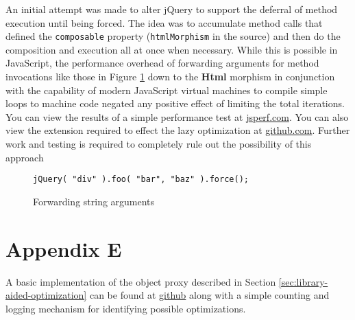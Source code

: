 \documentclass[preprint]{sigplanconf}
\begin{document}
An initial attempt was made to alter jQuery to support the deferral of method execution until being forced. The idea was to accumulate method calls that defined the \verb|composable| property (\verb|htmlMorphism| in the source) and then do the composition and execution all at once when necessary. While this is possible in JavaScript, the performance overhead of forwarding arguments for method invocations like those in Figure \ref{fig:args-juggle} down to the \textbf{Html} morphism in conjunction with the capability of modern JavaScript virtual machines to compile simple loops to machine code negated any positive effect of limiting the total iterations. You can view the results of a simple performance test at \href{http://jsperf.com/lazy-loop-fusion-vs-traditional-method-chaning/5}{jsperf.com}. You can also view the extension required to effect the lazy optimization at \href{https://github.com/johnbender/jquery-lazy-proxy/blob/79ab61e22547169d6f392512f782df2e29362ebc/lazy.js}{github.com}. Further work and testing is required to completely rule out the possibility of this approach

\begin{figure}[!ht]
\small
\begin{verbatim}
jQuery( "div" ).foo( "bar", "baz" ).force();
\end{verbatim}
\nocaptionrule \caption{Forwarding string arguments}
\label{fig:args-juggle}
\end{figure}

\section{Appendix E}

A basic implementation of the object proxy described in Section \ref{sec:library-aided-optimization} can be found at \href{https://github.com/johnbender/jquery-lazy-proxy/blob/79ab61e22547169d6f392512f782df2e29362ebc/lazy.js}{github} along with a simple counting and logging mechanism for identifying possible optimizations.



\end{document}
